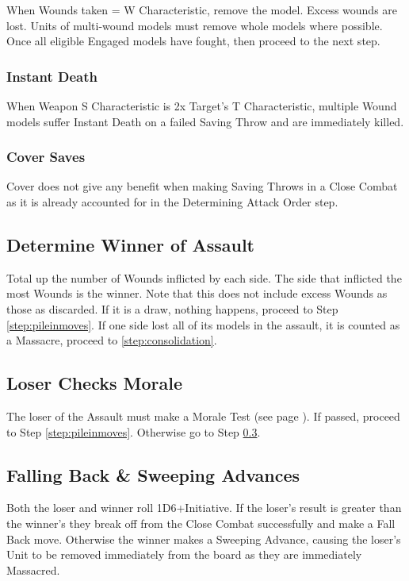 When Wounds taken = W Characteristic, remove the model.
Excess wounds are lost. Units of multi-wound models must
remove whole models where possible. Once all eligible
Engaged models have fought, then proceed to the next step.

\subsubsection{Instant Death}
When Weapon S Characteristic is 2x Target's T Characteristic,
multiple Wound models suffer Instant Death on a failed Saving
Throw and are immediately killed.

\subsubsection{Cover Saves}
Cover does not give any benefit when making Saving Throws
in a Close Combat as it is already accounted for in the
Determining Attack Order step.

\subsection{Determine Winner of Assault}
Total up the number of Wounds inflicted by each side. The side
that inflicted the most Wounds is the winner. Note that this
does not include excess Wounds as those as discarded. If it is
a draw, nothing happens, proceed to Step \ref{step:pileinmoves}. If one side lost all
of its models in the assault, it is counted as a Massacre,
proceed to \ref{step:consolidation}.

\subsection{Loser Checks Morale}
The loser of the Assault must make a Morale Test (see page
\pageref{sec:morale}). If passed, proceed to Step \ref{step:pileinmoves}. Otherwise go to Step \ref{step:fallingbacksweepingadvances}.

\subsection{Falling Back \& Sweeping Advances}
\label{step:fallingbacksweepingadvances}
Both the loser and winner roll 1D6+Initiative. If the loser's
result is greater than the winner's they break off from the Close
Combat successfully and make a Fall Back move. Otherwise
the winner makes a Sweeping Advance, causing the loser's
Unit to be removed immediately from the board as they are
immediately Massacred.


